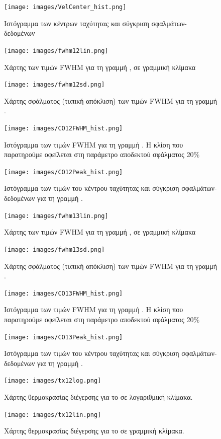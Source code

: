 \documentclass[a4paper,12pt]{memoir}
\begin{document}
\begin{figure}[h]
	\centering
	\texttt{[image: images/VelCenter\_hist.png]}
	\caption{Ιστόγραμμα των κέντρων ταχύτητας και σύγκριση σφαλμάτων-δεδομένων}
\end{figure}


\begin{figure}[h]
	\centering
	\texttt{[image: images/fwhm12lin.png]}
	\caption{Χάρτης των τιμών FWHM για τη γραμμή , σε γραμμική κλίμακα}
	
	\centering
	\texttt{[image: images/fwhm12sd.png]}
	\caption{Χάρτης σφάλματος (τυπική απόκλιση) των τιμών FWHM για τη γραμμή .}
\end{figure}

\begin{figure}[h]
	\centering
	\texttt{[image: images/CO12FWHM\_hist.png]}
	\caption{Ιστόγραμμα των τιμών FWHM για τη γραμμή . Η κλίση που παρατηρούμε οφείλεται στη παράμετρο αποδεκτού σφάλματος 20\%}
	
	\centering
	\texttt{[image: images/CO12Peak\_hist.png]}
	\caption{Ιστόγραμμα των τιμών του κέντρου ταχύτητας και σύγκριση σφαλμάτων-δεδομένων για τη γραμμή .}
\end{figure}

\begin{figure}[h]
	\centering
	\texttt{[image: images/fwhm13lin.png]}
	\caption{Χάρτης των τιμών FWHM για τη γραμμή , σε γραμμική κλίμακα}
	
	\centering
	\texttt{[image: images/fwhm13sd.png]}
	\caption{Χάρτης σφάλματος (τυπική απόκλιση) των τιμών FWHM για τη γραμμή .}
\end{figure}

\begin{figure}[h]
	\centering
	\texttt{[image: images/CO13FWHM\_hist.png]}
	\caption{Ιστόγραμμα των τιμών FWHM για τη γραμμή . Η κλίση που παρατηρούμε οφείλεται στη παράμετρο αποδεκτού σφάλματος 20\%}
	
	\centering
	\texttt{[image: images/CO13Peak\_hist.png]}
	\caption{Ιστόγραμμα των τιμών του κέντρου ταχύτητας και σύγκριση σφαλμάτων-δεδομένων για τη γραμμή .}
\end{figure}


\begin{figure}[h]
	\centering
	\texttt{[image: images/tx12log.png]}
	\caption{Χάρτης θερμοκρασίας διέγερσης για το  σε λογαριθμική κλίμακα.}
	\centering
	\texttt{[image: images/tx12lin.png]}
	\caption{Χάρτης θερμοκρασίας διέγερσης για το  σε γραμμική κλίμακα.}
\end{figure}
\end{document}
